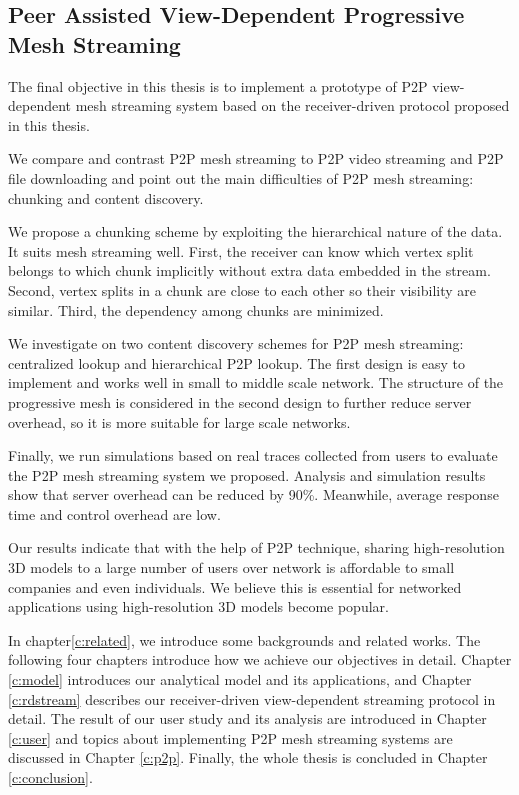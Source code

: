     \subsection{Peer Assisted View-Dependent Progressive Mesh Streaming}
    The final objective in this thesis is to implement a prototype of 
    P2P view-dependent mesh streaming system
    based on the receiver-driven protocol proposed in this thesis.
    
    We compare and contrast P2P mesh streaming to P2P
    video streaming and P2P file downloading and point out
    the main difficulties of P2P mesh streaming:  
    chunking and content discovery.

    We propose a chunking scheme by exploiting the hierarchical 
    nature of the data. It suits mesh streaming well.
    First, the receiver can know which vertex split belongs to
    which chunk implicitly without extra data embedded in the stream.
    Second, vertex splits in a chunk are close to each other so
    their visibility are similar. Third, the dependency among chunks
    are minimized.

    We investigate on two content discovery schemes for P2P
    mesh streaming: centralized lookup and hierarchical P2P lookup.
    The first design is easy to implement and works well in small to 
    middle scale network. The structure of the progressive
    mesh is considered in the second design to further
    reduce server overhead, so it is more suitable for large scale networks. 
    
    Finally, we run simulations based on real
    traces collected from users to evaluate the P2P
    mesh streaming system we proposed.  Analysis and
    simulation results show that server overhead can be
    reduced by 90\%. Meanwhile,  average response time and
    control overhead are low.

    Our results indicate that with the help of P2P technique,
    sharing high-resolution
    3D models to a large number of users over network is affordable
    to small companies and even individuals. We believe this is
    essential for networked applications using high-resolution 3D models
    become popular.

    In chapter\ref{c:related}, we introduce some backgrounds and related works.
    The following four chapters introduce how we achieve our objectives in detail.
    Chapter \ref{c:model} introduces our analytical model and its applications, and
    Chapter \ref{c:rdstream} describes our receiver-driven view-dependent streaming
    protocol in detail. The result of our user study and its analysis are introduced
    in Chapter \ref{c:user} and topics about implementing P2P mesh streaming systems
    are discussed in Chapter \ref{c:p2p}. Finally, the whole thesis is concluded in
    Chapter \ref{c:conclusion}.

